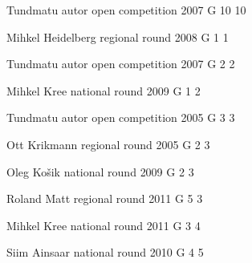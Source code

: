 \documentclass[11pt]{article}
\begin{document}
\ylDisplay{} %
{Tundmatu autor} %
{open competition} %
{2007} %
{G 10} %
{10} %
{

\ifEngSolution
\fi
}

\ylDisplay{} %
{Mihkel Heidelberg} %
{regional round} %
{2008} %
{G 1} %
{1} %
{

\ifEngSolution
\fi
}

\ylDisplay{} %
{Tundmatu autor} %
{open competition} %
{2007} %
{G 2} %
{2} %
{

\ifEngSolution
\fi
}

\ylDisplay{} %
{Mihkel Kree} %
{national round} %
{2009} %
{G 1} %
{2} %
{

\ifEngSolution
\fi
}

\ylDisplay{} %
{Tundmatu autor} %
{open competition} %
{2005} %
{G 3} %
{3} %
{

\ifEngSolution
\fi
}

\ylDisplay{} %
{Ott Krikmann} %
{regional round} %
{2005} %
{G 2} %
{3} %
{

\ifEngSolution
\fi
}

\ylDisplay{} %
{Oleg Košik} %
{national round} %
{2009} %
{G 2} %
{3} %
{

\ifEngSolution
\fi
}

\ylDisplay{} %
{Roland Matt} %
{regional round} %
{2011} %
{G 5} %
{3} %
{

\ifEngSolution
\fi
}

\ylDisplay{} %
{Mihkel Kree} %
{national round} %
{2011} %
{G 3} %
{4} %
{

\ifEngSolution
\fi
}

\ylDisplay{} %
{Siim Ainsaar} %
{national round} %
{2010} %
{G 4} %
{5} %
{

\ifEngSolution
\fi
}
\end{document}
